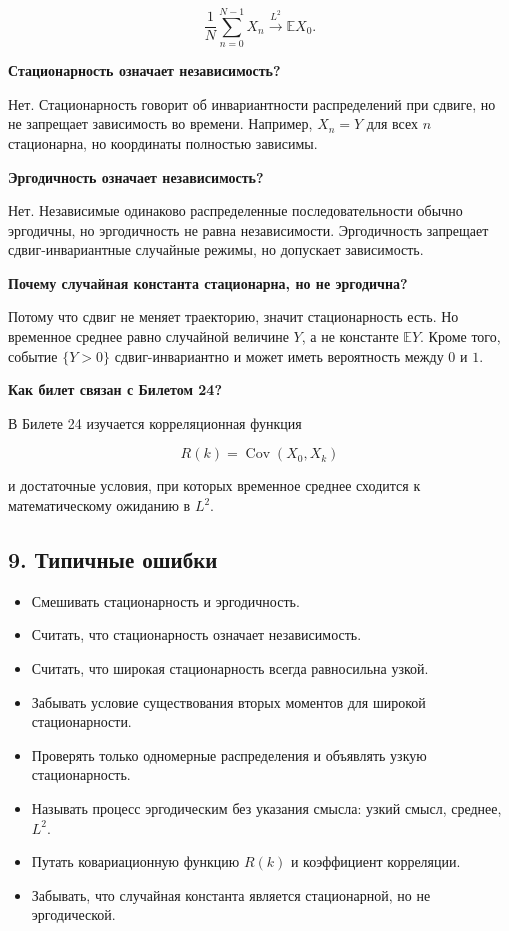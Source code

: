 \documentclass[
  11pt,
  a4paper,
]{article}
\providecommand{\tightlist}{%
  \setlength{\itemsep}{0pt}\setlength{\parskip}{0pt}}
\begin{document}
\[
\frac1N\sum_{n=0}^{N-1}X_n
\xrightarrow{L^2}
\mathbb E X_0.
\]

\textbf{Стационарность означает независимость?}

Нет. Стационарность говорит об инвариантности распределений при сдвиге,
но не запрещает зависимость во времени. Например, \(X_n=Y\) для всех
\(n\) стационарна, но координаты полностью зависимы.

\textbf{Эргодичность означает независимость?}

Нет. Независимые одинаково распределенные последовательности обычно
эргодичны, но эргодичность не равна независимости. Эргодичность
запрещает сдвиг-инвариантные случайные режимы, но допускает зависимость.

\textbf{Почему случайная константа стационарна, но не эргодична?}

Потому что сдвиг не меняет траекторию, значит стационарность есть. Но
временное среднее равно случайной величине \(Y\), а не константе
\(\mathbb EY\). Кроме того, событие \(\{Y>0\}\) сдвиг-инвариантно и
может иметь вероятность между \(0\) и \(1\).

\textbf{Как билет связан с Билетом 24?}

В Билете 24 изучается корреляционная функция

\[
R(k)=\operatorname{Cov}(X_0,X_k)
\]

и достаточные условия, при которых временное среднее сходится к
математическому ожиданию в \(L^2\).

\subsection{9. Типичные
ошибки}\label{ux442ux438ux43fux438ux447ux43dux44bux435-ux43eux448ux438ux431ux43aux438}

\begin{itemize}
\tightlist
\item
  Смешивать стационарность и эргодичность.
\item
  Считать, что стационарность означает независимость.
\item
  Считать, что широкая стационарность всегда равносильна узкой.
\item
  Забывать условие существования вторых моментов для широкой
  стационарности.
\item
  Проверять только одномерные распределения и объявлять узкую
  стационарность.
\item
  Называть процесс эргодическим без указания смысла: узкий смысл,
  среднее, \(L^2\).
\item
  Путать ковариационную функцию \(R(k)\) и коэффициент корреляции.
\item
  Забывать, что случайная константа является стационарной, но не
  эргодической.
\end{itemize}
\end{document}
